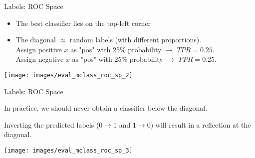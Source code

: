 \documentclass[11pt,compress,t,notes=noshow, xcolor=table]{beamer}
\newenvironment{knitrout}{}{} %
\begin{document}
\begin{vbframe}{Labels: ROC Space}
  \begin{itemize}
  \item The best classifier lies on the top-left corner
  \item The diagonal $\approx$ random labels (with different proportions).\\ 
  Assign positive $x$ as "pos" with 25\% probability $\rightarrow$ $TPR = 0.25$.\\ 
  Assign negative $x$ as "pos" with 25\% probability $\rightarrow$ $FPR = 0.25$.
\end{itemize}

\lz
\begin{knitrout}\scriptsize
{}\color{fgcolor}

{\centering \texttt{[image: images/eval\_mclass\_roc\_sp\_2]} 

}



\end{knitrout}
\end{vbframe}

\begin{vbframe}{Labels: ROC Space}

In practice, we should never obtain a classifier below the diagonal.\\

\lz

Inverting the predicted labels ($0 \rightarrow 1$ and $1 \rightarrow 0$) will result in a reflection at the diagonal. 

\lz

\begin{knitrout}\scriptsize
{}\color{fgcolor}

{\centering \texttt{[image: images/eval\_mclass\_roc\_sp\_3]} 

}



\end{knitrout}
\end{vbframe}
\end{document}
